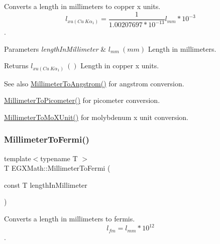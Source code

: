 Converts a length in millimeters to copper x units. \[ l_{xu(Cu\ K\alpha_1)}= \frac{1}{1.00207697*10^{-13}} l_{mm} * 10^{-3}\]. 


\begin{DoxyParams}{Parameters}
{\em length\+In\+Millimeter} & $ l_{mm}\ (mm)$ Length in millimeters. \\
\hline
\end{DoxyParams}
\begin{DoxyReturn}{Returns}
$ l_{xu(Cu\ K\alpha_1)}\ ()$ Length in copper x units. 
\end{DoxyReturn}
\begin{DoxySeeAlso}{See also}
\mbox{\hyperlink{group___e_g_x_math-_conversions-_length_conversions-_s_i-_millimeter-_non-_s_i_ga40e4659f4689e5be54f8e28fd8ce0008}{Millimeter\+To\+Angstrom()}} for angstrom conversion. 

\mbox{\hyperlink{group___e_g_x_math-_conversions-_length_conversions-_s_i-_millimeter-_s_i_ga679e3714c229f1355a5c9bf707fcd723}{Millimeter\+To\+Picometer()}} for picometer conversion. 

\mbox{\hyperlink{group___e_g_x_math-_conversions-_length_conversions-_s_i-_millimeter-_non-_s_i_ga1f0be98bc702f46a69579b27e05a2439}{Millimeter\+To\+Mo\+X\+Unit()}} for molybdenum x unit conversion. 
\end{DoxySeeAlso}
\mbox{\label{group___e_g_x_math-_conversions-_length_conversions-_s_i-_millimeter-_non-_s_i_gaeb57dff8b2e092b5a655ffdd9960897d}} 
\subsubsection{\texorpdfstring{Millimeter\+To\+Fermi()}{MillimeterToFermi()}}
{\footnotesize\ttfamily template$<$typename T $>$ \\
T E\+G\+X\+Math\+::\+Millimeter\+To\+Fermi (\begin{DoxyParamCaption}\item[{const T}]{length\+In\+Millimeter }\end{DoxyParamCaption})}



Converts a length in millimeters to fermis. \[ l_{fm}=l_{mm} * 10^{12} \]. 



